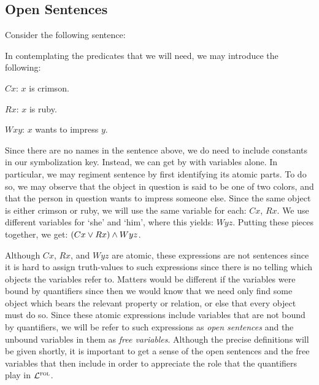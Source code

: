 \subsection{Open Sentences}

Consider the following sentence:

\begin{earg} \label{open}
\end{earg}

In contemplating the predicates that we will need, we may introduce the following:

\begin{ekey}[leftmargin=.7in]
  \item[$Cx$:] $x$ is crimson.
  \item[$Rx$:] $x$ is ruby.
  \item[$Wxy$:] $x$ wants to impress $y$.
\end{ekey}

Since there are no names in the sentence  above, we do need to include constants in our symbolization key.
Instead, we can get by with variables alone.
In particular, we may regiment sentence  by first identifying its atomic parts.
To do so, we may observe that the object in question is said to be one of two colors, and that the person in question wants to impress someone else.
Since the same object is either crimson or ruby, we will use the same variable for each: $Cx$, $Rx$.
We use different variables for `she' and `him', where this yields: $Wyz$.
Putting these pieces together, we get: $(Cx \vee Rx) \wedge Wyz$.

Although $Cx$, $Rx$, and $Wyz$ are atomic, these expressions are not sentences since it is hard to assign truth-values to such expressions since there is no telling which objects the variables refer to.
Matters would be different if the variables were bound by quantifiers since then we would know that we need only find some object which bears the relevant property or relation, or else that every object must do so.
Since these atomic expressions include variables that are not bound by quantifiers, we will be refer to such expressions as \textit{open sentences} and the unbound variables in them as \textit{free variables}.
Although the precise definitions will be given shortly, it is important to get a sense of the open sentences and the free variables that then include in order to appreciate the role that the quantifiers play in $\mathcal{L}^{\textsc{fol}}$.

